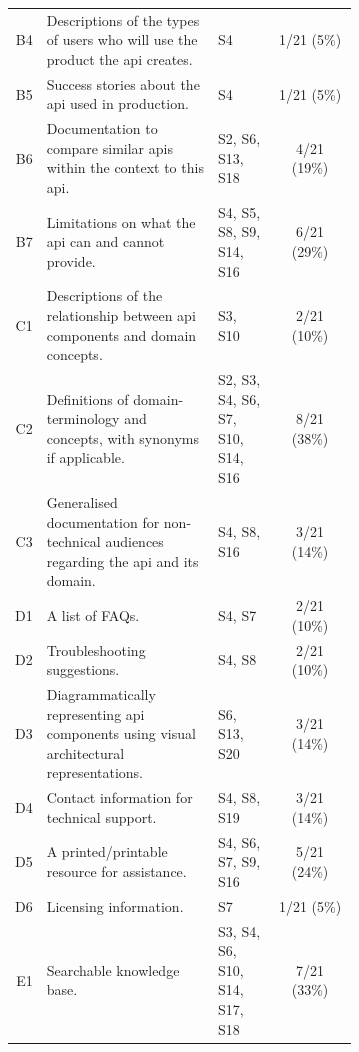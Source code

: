 \begin{small}
\begin{longtable}{rp{0.5\linewidth}|p{0.175\linewidth}|c}
  B4&
  Descriptions of the types of users who will use the product the \gls{api} creates.
  &
  S4 &
  1/21 (5\%)\\


  B5&
  Success stories about the \gls{api} used in production.
  &
  S4 &
  1/21 (5\%)\\


  B6&
  Documentation to compare similar \glspl{api} within the context to this \gls{api}.
  &
  S2, S6, S13, S18 &
  4/21 (19\%)\\


  B7&
  Limitations on what the \gls{api} can and cannot provide.
  &
  S4, S5, S8, S9, S14, S16 &
  6/21 (29\%)\\

  \midrule
  C1&
  Descriptions of the relationship between \gls{api} components and domain concepts.
  &
  S3, S10 &
  2/21 (10\%)\\

  C2&
  Definitions of domain-terminology and concepts, with synonyms if applicable.
  &
  S2, S3, S4, S6, S7, S10, S14, S16 &
  8/21 (38\%)\\

  C3&
  Generalised documentation for non-technical audiences regarding the \gls{api} and its domain.
  &
  S4, S8, S16 &
  3/21 (14\%)\\

  \midrule
  D1&
  A list of FAQs.
  &
  S4, S7 &
  2/21 (10\%)\\

  D2&
  Troubleshooting suggestions.
  &
  S4, S8 &
  2/21 (10\%)\\

  D3&
  Diagrammatically representing \gls{api} components using visual architectural representations.
  &
  S6, S13, S20 &
  3/21 (14\%)\\

  D4&
  Contact information for technical support.
  &
  S4, S8, S19 &
  3/21 (14\%)\\

  D5&
  A printed/printable resource for assistance.
  &
  S4, S6, S7, S9, S16 &
  5/21 (24\%)\\

  D6&
  Licensing information.
  &
  S7 &
  1/21 (5\%)\\

  \midrule
  E1&
  Searchable knowledge base.
  &
  S3, S4, S6, S10, S14, S17, S18 &
  7/21 (33\%)\\


\end{longtable}
\end{small}
